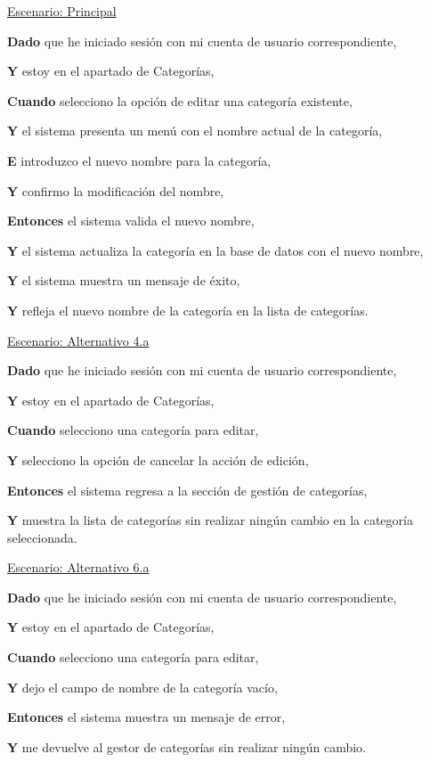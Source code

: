 \underline{Escenario: Principal}\par
\vspace{0.15cm}

\textbf{Dado} que he iniciado sesión con mi cuenta de usuario correspondiente,\par
\textbf{Y} estoy en el apartado de Categorías,\par
\textbf{Cuando} selecciono la opción de editar una categoría existente,\par
\textbf{Y} el sistema presenta un menú con el nombre actual de la categoría,\par
\textbf{E} introduzco el nuevo nombre para la categoría,\par
\textbf{Y} confirmo la modificación del nombre,\par
\textbf{Entonces} el sistema valida el nuevo nombre,\par
\textbf{Y} el sistema actualiza la categoría en la base de datos con el nuevo nombre,\par
\textbf{Y} el sistema muestra un mensaje de éxito,\par
\textbf{Y} refleja el nuevo nombre de la categoría en la lista de categorías.\par

\vspace{0.20cm}

\underline{Escenario: Alternativo 4.a}\par
\vspace{0.15cm}

\textbf{Dado} que he iniciado sesión con mi cuenta de usuario correspondiente,\par
\textbf{Y} estoy en el apartado de Categorías,\par
\textbf{Cuando} selecciono una categoría para editar,\par
\textbf{Y} selecciono la opción de cancelar la acción de edición,\par
\textbf{Entonces} el sistema regresa a la sección de gestión de categorías,\par
\textbf{Y} muestra la lista de categorías sin realizar ningún cambio en la categoría seleccionada.\par

\underline{Escenario: Alternativo 6.a}\par
\vspace{0.15cm}

\textbf{Dado} que he iniciado sesión con mi cuenta de usuario correspondiente,\par
\textbf{Y} estoy en el apartado de Categorías,\par
\textbf{Cuando} selecciono una categoría para editar,\par
\textbf{Y} dejo el campo de nombre de la categoría vacío,\par
\textbf{Entonces} el sistema muestra un mensaje de error,\par
\textbf{Y} me devuelve al gestor de categorías sin realizar ningún cambio.\par

